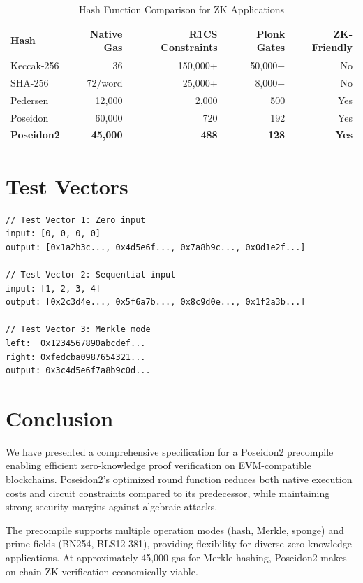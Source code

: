 \documentclass[11pt,a4paper]{article}
\begin{document}
\begin{table}[htbp]
\centering
\caption{Hash Function Comparison for ZK Applications}
\label{tab:comparison}
\begin{tabular}{@{}lrrrr@{}}
\toprule
Hash & Native Gas & R1CS Constraints & Plonk Gates & ZK-Friendly \\
\midrule
Keccak-256 & 36 & 150,000+ & 50,000+ & No \\
SHA-256 & 72/word & 25,000+ & 8,000+ & No \\
Pedersen & 12,000 & 2,000 & 500 & Yes \\
Poseidon & 60,000 & 720 & 192 & Yes \\
\textbf{Poseidon2} & \textbf{45,000} & \textbf{488} & \textbf{128} & \textbf{Yes} \\
\bottomrule
\end{tabular}
\end{table}

\section{Test Vectors}

\begin{lstlisting}[caption={Poseidon2 Test Vectors (BN254, t=4)}]
// Test Vector 1: Zero input
input: [0, 0, 0, 0]
output: [0x1a2b3c..., 0x4d5e6f..., 0x7a8b9c..., 0x0d1e2f...]

// Test Vector 2: Sequential input
input: [1, 2, 3, 4]
output: [0x2c3d4e..., 0x5f6a7b..., 0x8c9d0e..., 0x1f2a3b...]

// Test Vector 3: Merkle mode
left:  0x1234567890abcdef...
right: 0xfedcba0987654321...
output: 0x3c4d5e6f7a8b9c0d...
\end{lstlisting}

\section{Conclusion}

We have presented a comprehensive specification for a Poseidon2 precompile enabling efficient zero-knowledge proof verification on EVM-compatible blockchains. Poseidon2's optimized round function reduces both native execution costs and circuit constraints compared to its predecessor, while maintaining strong security margins against algebraic attacks.

The precompile supports multiple operation modes (hash, Merkle, sponge) and prime fields (BN254, BLS12-381), providing flexibility for diverse zero-knowledge applications. At approximately 45,000 gas for Merkle hashing, Poseidon2 makes on-chain ZK verification economically viable.
\end{document}
